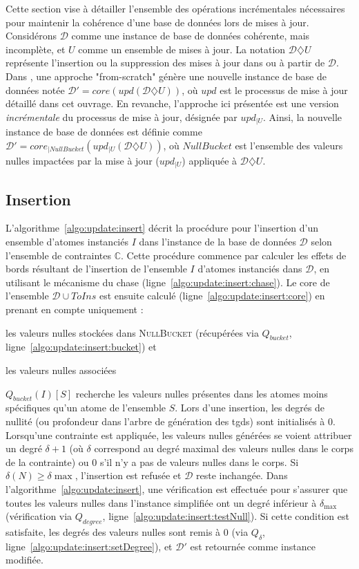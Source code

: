 Cette section vise à détailler l'ensemble des opérations incrémentales nécessaires pour maintenir la cohérence d'une base de données lors de mises à jour.
Considérons $\mathcal{D}$ comme une instance de base de données cohérente, mais incomplète, et $U$ comme un ensemble de mises à jour.
La notation $\mathcal{D} \diamondsuit U$ représente l'insertion ou la suppression des mises à jour dans ou à partir de $\mathcal{D}$.
Dans \cite{chabinConsistentUpdatingDatabases2020}, une approche "from-scratch" génère une nouvelle instance de base de données notée $\mathcal{D}' = core(upd(\mathcal{D} \diamondsuit U))$, où $upd$ est le processus de mise à jour détaillé dans cet ouvrage.
En revanche, l'approche ici présentée est une version \textit{incrémentale} du processus de mise à jour, désignée par $upd_{|U}$.
Ainsi, la nouvelle instance de base de données est définie comme $\mathcal{D}' = core_{|NullBucket}(upd_{|U}(\mathcal{D}\diamondsuit U))$, où $NullBucket$ est l'ensemble des valeurs nulles impactées par la mise à jour ($upd_{|U}$) appliquée à $\mathcal{D} \diamondsuit U$.

\subsection{Insertion}
\label{sec:update:insert}
L'algorithme~\ref{algo:update:insert} décrit la procédure pour l'insertion d'un ensemble d'atomes instanciés $I$ dans l'instance de la base de données $\mathcal{D}$ selon l'ensemble de contraintes $\mathbb{C}$.
Cette procédure commence par calculer les effets de bords résultant de l'insertion de l'ensemble $I$ d'atomes instanciés dans $\mathcal{D}$, en utilisant le mécanisme du \gls{chase} (ligne~\ref{algo:update:insert:chase}).
Le \gls{core} de l'ensemble $\mathcal{D} \cup ToIns$ est ensuite calculé (ligne~\ref{algo:update:insert:core}) en prenant en compte uniquement :
\begin{enumerate*}[label=(\alph*)]
    \item les valeurs nulles stockées dans \textsc{NullBucket} (récupérées via $Q_{bucket}$, ligne~\ref{algo:update:insert:bucket}) et
    \item les valeurs nulles associées
\end{enumerate*}
$Q_{bucket}(I){[S]}$ recherche les valeurs nulles présentes dans les atomes moins spécifiques qu'un atome de l'ensemble $S$.
Lors d'une insertion, les degrés de nullité (ou profondeur dans l'arbre de génération des \glspl{tgd}) sont initialisés à 0.
Lorsqu'une contrainte est appliquée, les valeurs nulles générées se voient attribuer un degré $\delta + 1$ (où $\delta$ correspond au degré maximal des valeurs nulles dans le corps de la contrainte) ou 0 s'il n'y a pas de valeurs nulles dans le corps.
Si $\delta(N) \geq \delta{\max}$, l'insertion est refusée et $\mathcal{D}$ reste inchangée.
Dans l'algorithme~\ref{algo:update:insert}, une vérification est effectuée pour s'assurer que toutes les valeurs nulles dans l'instance simplifiée ont un degré inférieur à $\delta_{\max}$ (vérification via $Q_{degree}$, ligne~\ref{algo:update:insert:testNull}).
Si cette condition est satisfaite, les degrés des valeurs nulles sont remis à 0 (via $Q_{\delta}$, ligne~\ref{algo:update:insert:setDegree}), et $\mathcal{D}'$ est retournée comme instance modifiée.

